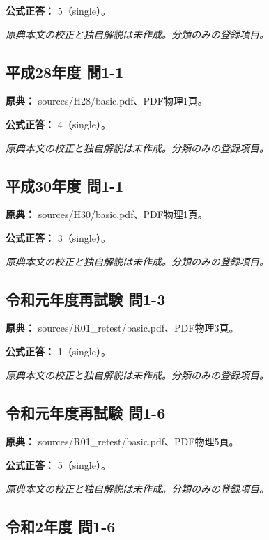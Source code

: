 \textbf{公式正答：} 5（single）。

\par\textit{原典本文の校正と独自解説は未作成。分類のみの登録項目。}

\subsection{平成28年度 問1-1}
\label{q:h28-reg-basic-1-1}

\noindent\textbf{原典：} sources/H28/basic.pdf、PDF物理1頁。

\textbf{公式正答：} 4（single）。

\par\textit{原典本文の校正と独自解説は未作成。分類のみの登録項目。}

\subsection{平成30年度 問1-1}
\label{q:h30-reg-basic-1-1}

\noindent\textbf{原典：} sources/H30/basic.pdf、PDF物理1頁。

\textbf{公式正答：} 3（single）。

\par\textit{原典本文の校正と独自解説は未作成。分類のみの登録項目。}

\subsection{令和元年度再試験 問1-3}
\label{q:r01-ret-basic-1-3}

\noindent\textbf{原典：} sources/R01\_retest/basic.pdf、PDF物理3頁。

\textbf{公式正答：} 1（single）。

\par\textit{原典本文の校正と独自解説は未作成。分類のみの登録項目。}

\subsection{令和元年度再試験 問1-6}
\label{q:r01-ret-basic-1-6}

\noindent\textbf{原典：} sources/R01\_retest/basic.pdf、PDF物理5頁。

\textbf{公式正答：} 5（single）。

\par\textit{原典本文の校正と独自解説は未作成。分類のみの登録項目。}

\subsection{令和2年度 問1-6}
\label{q:r02-reg-basic-1-6}

